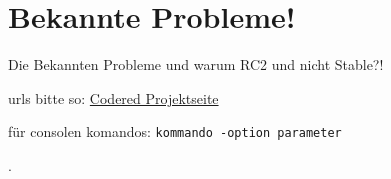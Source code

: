 \chapter{Bekannte Probleme!}  %
\label{chapter:Bekannte Probleme!}  %

Die Bekannten Probleme und warum RC2 und nicht Stable?!

urls bitte so:
\href{http://codered.berlios.de}{Codered Projektseite}


für consolen komandos:
\verb|kommando -option parameter|

.
